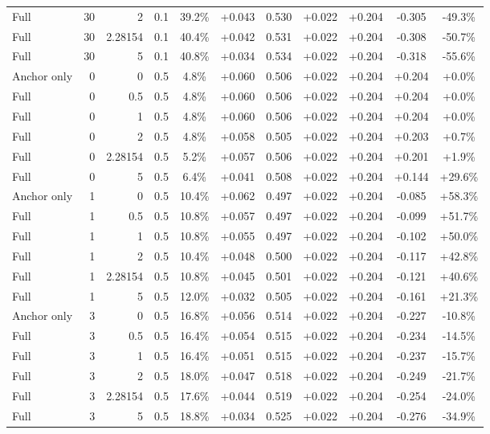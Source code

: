 \begin{table}[htbp]
\begin{tabular}{lrrrccccccc}
Full & 30 & 2 & 0.1 & 39.2\% & +0.043 & 0.530 & +0.022 & +0.204 & -0.305 & -49.3\% \\
Full & 30 & 2.28154 & 0.1 & 40.4\% & +0.042 & 0.531 & +0.022 & +0.204 & -0.308 & -50.7\% \\
Full & 30 & 5 & 0.1 & 40.8\% & +0.034 & 0.534 & +0.022 & +0.204 & -0.318 & -55.6\% \\
Anchor only & 0 & 0 & 0.5 & 4.8\% & +0.060 & 0.506 & +0.022 & +0.204 & +0.204 & +0.0\% \\
Full & 0 & 0.5 & 0.5 & 4.8\% & +0.060 & 0.506 & +0.022 & +0.204 & +0.204 & +0.0\% \\
Full & 0 & 1 & 0.5 & 4.8\% & +0.060 & 0.506 & +0.022 & +0.204 & +0.204 & +0.0\% \\
Full & 0 & 2 & 0.5 & 4.8\% & +0.058 & 0.505 & +0.022 & +0.204 & +0.203 & +0.7\% \\
Full & 0 & 2.28154 & 0.5 & 5.2\% & +0.057 & 0.506 & +0.022 & +0.204 & +0.201 & +1.9\% \\
Full & 0 & 5 & 0.5 & 6.4\% & +0.041 & 0.508 & +0.022 & +0.204 & +0.144 & +29.6\% \\
Anchor only & 1 & 0 & 0.5 & 10.4\% & +0.062 & 0.497 & +0.022 & +0.204 & -0.085 & +58.3\% \\
Full & 1 & 0.5 & 0.5 & 10.8\% & +0.057 & 0.497 & +0.022 & +0.204 & -0.099 & +51.7\% \\
Full & 1 & 1 & 0.5 & 10.8\% & +0.055 & 0.497 & +0.022 & +0.204 & -0.102 & +50.0\% \\
Full & 1 & 2 & 0.5 & 10.4\% & +0.048 & 0.500 & +0.022 & +0.204 & -0.117 & +42.8\% \\
Full & 1 & 2.28154 & 0.5 & 10.8\% & +0.045 & 0.501 & +0.022 & +0.204 & -0.121 & +40.6\% \\
Full & 1 & 5 & 0.5 & 12.0\% & +0.032 & 0.505 & +0.022 & +0.204 & -0.161 & +21.3\% \\
Anchor only & 3 & 0 & 0.5 & 16.8\% & +0.056 & 0.514 & +0.022 & +0.204 & -0.227 & -10.8\% \\
Full & 3 & 0.5 & 0.5 & 16.4\% & +0.054 & 0.515 & +0.022 & +0.204 & -0.234 & -14.5\% \\
Full & 3 & 1 & 0.5 & 16.4\% & +0.051 & 0.515 & +0.022 & +0.204 & -0.237 & -15.7\% \\
Full & 3 & 2 & 0.5 & 18.0\% & +0.047 & 0.518 & +0.022 & +0.204 & -0.249 & -21.7\% \\
Full & 3 & 2.28154 & 0.5 & 17.6\% & +0.044 & 0.519 & +0.022 & +0.204 & -0.254 & -24.0\% \\
Full & 3 & 5 & 0.5 & 18.8\% & +0.034 & 0.525 & +0.022 & +0.204 & -0.276 & -34.9\% \\

\end{tabular}
\end{table}
